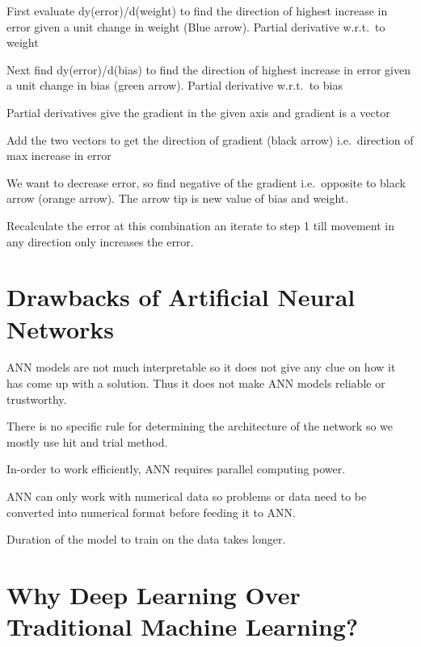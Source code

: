 	\begin{numberedlist}
		\item First evaluate dy(error)/d(weight) to find the direction of highest increase in error given a unit change in weight (Blue arrow). Partial derivative w.r.t.\ to weight
		\item Next find dy(error)/d(bias) to find the direction of highest increase in error given a unit change in bias (green arrow). Partial derivative w.r.t.\ to bias
		\item Partial derivatives give the gradient in the given axis and gradient is a vector
		\item Add the two vectors to get the direction of gradient (black arrow) i.e.\ direction of max increase in error
		\item We want to decrease error, so find negative of the gradient i.e.\ opposite to black arrow (orange arrow).  The arrow tip is new value of bias and weight.
		\item Recalculate the error at this combination an iterate to step 1 till movement in any direction only increases the error.
	\end{numberedlist}


	\section{Drawbacks of Artificial Neural Networks}

	\begin{bulletedlist}
		\item ANN models are not much interpretable so it does not give any clue on how it has come up with a solution. Thus it does not make ANN models reliable or trustworthy.
		\item There is no specific rule for determining the architecture of the network so we mostly use hit and trial method.
		\item In-order to work efficiently, ANN requires parallel computing power.
		\item ANN can only work with numerical data so problems or data need to be converted into numerical format before feeding it to ANN.
		\item Duration of the model to train on the data takes longer.
	\end{bulletedlist}

	\section{Why Deep Learning Over Traditional Machine Learning?}

